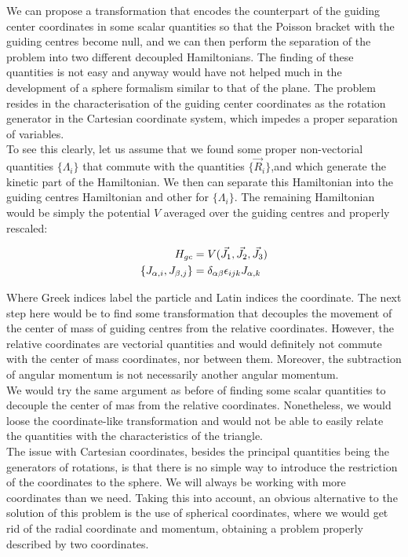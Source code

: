 We can propose a transformation that encodes the counterpart of the guiding center coordinates in some scalar quantities so that the Poisson bracket with the guiding centres become null, and we can then perform the separation of the problem into two different decoupled Hamiltonians. The finding of these quantities is not easy and anyway would have not helped much in the development of a sphere formalism similar to that of the plane. The problem resides in the characterisation of the guiding center coordinates as the rotation generator in the Cartesian coordinate system, which impedes a proper separation of variables.\\

To see this clearly, let us assume that we found some proper non-vectorial quantities $\{\mathbb{\Lambda}_i\}$ that commute with the quantities $\{\vec{R}_i\}$,and which generate the kinetic part of the Hamiltonian. We then can separate this Hamiltonian into the guiding centres Hamiltonian and other for $\{\mathbb{\Lambda}_i\}$. The remaining Hamiltonian would be simply the potential $V$ averaged over the guiding centres and properly rescaled:

\begin{align*}
H_{gc} &= V(\vec{J_1},\vec{J_2},\vec{J_3})\\
\left\lbrace J_{\alpha,i}, J_{\beta,j} \right\rbrace &= \delta_{\alpha\beta}\epsilon_{ijk} J_{\alpha,k}
\end{align*}

Where Greek indices label the particle and Latin indices the coordinate. The next step here would be to find some transformation that decouples the movement of the center of mass of guiding centres from the relative coordinates. However, the relative coordinates are vectorial quantities and would definitely not commute with the center of mass coordinates, nor between them. Moreover, the subtraction of angular momentum is not necessarily another angular momentum. \\

We would try the same argument as before of finding some scalar quantities to decouple the center of mas from the relative coordinates. Nonetheless, we would loose the coordinate-like transformation and would not be able to easily relate the quantities with the characteristics of the triangle.\\

The issue with Cartesian coordinates, besides the principal quantities being the generators of rotations, is that there is no simple way to introduce the restriction of the coordinates to the sphere. We will always be working with more coordinates than we need. Taking this into account, an obvious alternative to the solution of this problem is the use of spherical coordinates, where we would get rid of the radial coordinate and momentum, obtaining a problem properly described by two coordinates.\\ 

